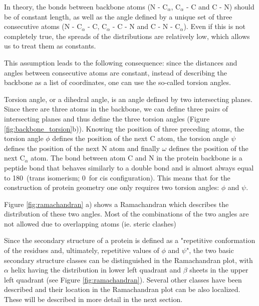 In theory, the bonds between backbone atoms (N - C$_\alpha$, C$_\alpha$ - C and C - N) should be of constant length, as well as the angle defined by a unique set of three consecutive atoms (N - C$_\alpha$ - C, C$_\alpha$ - C - N and C - N - C$_\alpha$). 
Even if this is not completely true, the spreads of the distributions are relatively low, which allows us to treat them as constants.

This assumption leads to the following consequence: since the distances and angles between consecutive atoms are constant, instead of describing the backbone as a list of coordinates, one can use the so-called torsion angles.

Torsion angle, or a dihedral angle, is an angle defined by two intersecting planes. 
Since there are three atoms in the backbone, we can define three pairs of intersecting planes and thus define the three torsion angles (Figure \ref{fig:backbone_torsion}b)). 
Knowing the position of three preceding atoms, the torsion angle $\phi$ defines the position of the next C atom, the torsion angle $\psi$ defines the position of the next N atom and finally $\omega$ defines the position of the next C$_\alpha$ atom. 
The bond between atom C and N in the protein backbone is a peptide bond that behaves similarly to a double bond and is almost always equal to 180\degree~(trans isomerism; 0\degree~for cis configuration). 
This means that for the construction of protein geometry one only requires two torsion angles: $\phi$ and $\psi$.

Figure \ref{fig:ramachandran} a) shows a Ramachandran which describes the distribution of these two angles. 
Most of the combinations of the two angles are not allowed due to overlapping atoms (ie. steric clashes) 

Since the secondary structure of a protein is defined as a "repetitive conformation of the residues and, ultimately, repetitive values of $\phi$ and $\psi$", the two basic secondary structure classes can be distinguished in the Ramachandran plot, with $\alpha$ helix having the distribution in lower left quadrant and $\beta$ sheets in the upper left quadrant (see Figure \ref{fig:ramachandran}). 
Several other classes have been described and their location in the Ramachandran plot can be also localized. These will be described in more detail in the next section. 

